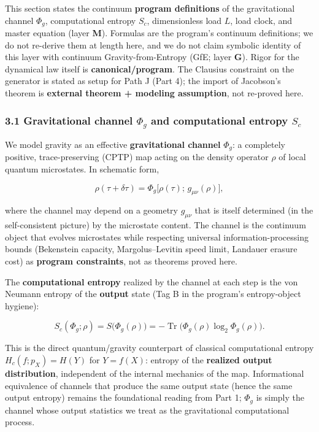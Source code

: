 \documentclass[
  11pt,
]{article}
\begin{document}
This section states the continuum \textbf{program definitions} of the gravitational channel \(\Phi_g\), computational entropy \(S_c\), dimensionless load \(L\), load clock, and master equation (layer \textbf{M}). Formulas are the program's continuum definitions; we do not re-derive them at length here, and we do not claim symbolic identity of this layer with continuum Gravity-from-Entropy (GfE; layer \textbf{G}). Rigor for the dynamical law itself is \textbf{canonical/program}. The Clausius constraint on the generator is stated as setup for Path J (Part 4); the import of Jacobson's theorem is \textbf{external theorem + modeling assumption}, not re-proved here.

\subsubsection{\texorpdfstring{3.1 Gravitational channel \(\Phi_g\) and computational entropy \(S_c\)}{3.1 Gravitational channel \textbackslash Phi\_g and computational entropy S\_c}}\label{gravitational-channel-phi_g-and-computational-entropy-s_c}

We model gravity as an effective \textbf{gravitational channel} \(\Phi_g\): a completely positive, trace-preserving (CPTP) map acting on the density operator \(\rho\) of local quantum microstates. In schematic form,

\[
\rho(\tau + \delta\tau)
=
\Phi_g\bigl[\rho(\tau);\, g_{\mu\nu}(\rho)\bigr],
\]

where the channel may depend on a geometry \(g_{\mu\nu}\) that is itself determined (in the self-consistent picture) by the microstate content. The channel is the continuum object that evolves microstates while respecting universal information-processing bounds (Bekenstein capacity, Margolus--Levitin speed limit, Landauer erasure cost) as \textbf{program constraints}, not as theorems proved here.

The \textbf{computational entropy} realized by the channel at each step is the von Neumann entropy of the \textbf{output} state (Tag B in the program's entropy-object hygiene):

\[
S_c(\Phi_g;\rho)
=
S\bigl(\Phi_g(\rho)\bigr)
=
-\operatorname{Tr}\bigl(\Phi_g(\rho)\log_2\Phi_g(\rho)\bigr).
\]

This is the direct quantum/gravity counterpart of classical computational entropy \(H_c(f;p_X)=H(Y)\) for \(Y=f(X)\): entropy of the \textbf{realized output distribution}, independent of the internal mechanics of the map. Informational equivalence of channels that produce the same output state (hence the same output entropy) remains the foundational reading from Part 1; \(\Phi_g\) is simply the channel whose output statistics we treat as the gravitational computational process.
\end{document}

